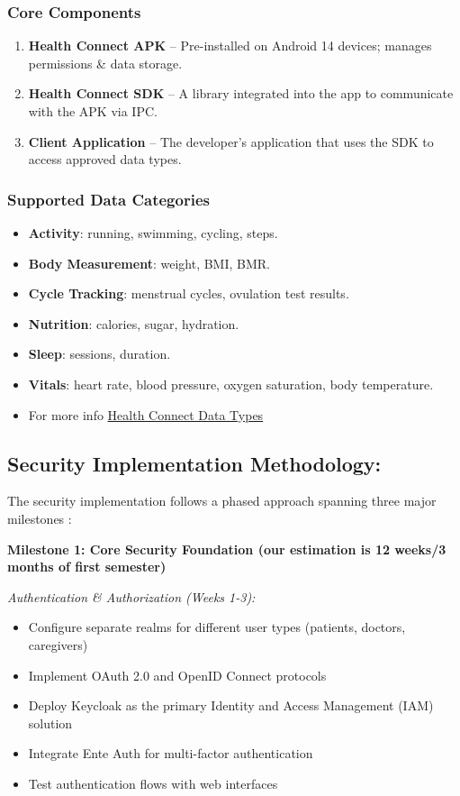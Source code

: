 \documentclass[a4paper, 12pt]{article}
\begin{document}
\subsubsection{Core Components}
\begin{enumerate}
    \item \textbf{Health Connect APK} -- Pre-installed on Android 14 devices; manages permissions \& data storage.
    \item \textbf{Health Connect SDK} -- A library integrated into the app to communicate with the APK via IPC.
    \item \textbf{Client Application} -- The developer’s application that uses the SDK to access approved data types.
\end{enumerate}

\subsubsection{Supported Data Categories}
\begin{itemize}
    \item \textbf{Activity}: running, swimming, cycling, steps.
    \item \textbf{Body Measurement}: weight, BMI, BMR.
    \item \textbf{Cycle Tracking}: menstrual cycles, ovulation test results.
    \item \textbf{Nutrition}: calories, sugar, hydration.
    \item \textbf{Sleep}: sessions, duration.
    \item \textbf{Vitals}: heart rate, blood pressure, oxygen saturation, body temperature.
    \item For more info \href{https://developer.android.com/health-and-fitness/guides/health-connect/plan/data-types}{Health Connect Data Types}
\end{itemize}

\subsection{Security Implementation Methodology:}

The security implementation follows a phased approach spanning three major milestones :

\textbf{Milestone 1: Core Security Foundation (our estimation is 12 weeks/3 months of first semester)}

\textit{Authentication \& Authorization (Weeks 1-3):}
\begin{itemize}
    \item Configure separate realms for different user types (patients, doctors, caregivers)
    \item Implement OAuth 2.0 and OpenID Connect protocols
    \item Deploy Keycloak as the primary Identity and Access Management (IAM) solution
    \item Integrate Ente Auth for multi-factor authentication
    \item Test authentication flows with web interfaces
\end{itemize}
\end{document}
